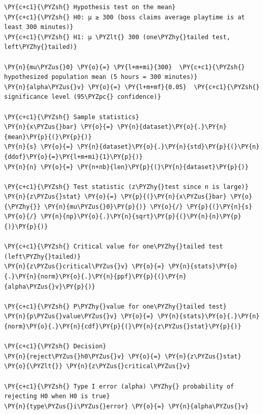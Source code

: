     \begin{tcolorbox}[breakable, size=fbox, boxrule=1pt, pad at break*=1mm,colback=cellbackground, colframe=cellborder]
\begin{Verbatim}[commandchars=\\\{\}]
\PY{c+c1}{\PYZsh{} Hypothesis test on the mean}
\PY{c+c1}{\PYZsh{} H0: μ ≥ 300 (boss claims average playtime is at least 300 minutes)}
\PY{c+c1}{\PYZsh{} H1: μ \PYZlt{} 300 (one\PYZhy{}tailed test, left\PYZhy{}tailed)}

\PY{n}{mu\PYZus{}0} \PY{o}{=} \PY{l+m+mi}{300}  \PY{c+c1}{\PYZsh{} hypothesized population mean (5 hours = 300 minutes)}
\PY{n}{alpha\PYZus{}v} \PY{o}{=} \PY{l+m+mf}{0.05}  \PY{c+c1}{\PYZsh{} significance level (95\PYZpc{} confidence)}

\PY{c+c1}{\PYZsh{} Sample statistics}
\PY{n}{x\PYZus{}bar} \PY{o}{=} \PY{n}{dataset}\PY{o}{.}\PY{n}{mean}\PY{p}{(}\PY{p}{)}
\PY{n}{s} \PY{o}{=} \PY{n}{dataset}\PY{o}{.}\PY{n}{std}\PY{p}{(}\PY{n}{ddof}\PY{o}{=}\PY{l+m+mi}{1}\PY{p}{)}
\PY{n}{n} \PY{o}{=} \PY{n+nb}{len}\PY{p}{(}\PY{n}{dataset}\PY{p}{)}

\PY{c+c1}{\PYZsh{} Test statistic (z\PYZhy{}test since n is large)}
\PY{n}{z\PYZus{}stat} \PY{o}{=} \PY{p}{(}\PY{n}{x\PYZus{}bar} \PY{o}{\PYZhy{}} \PY{n}{mu\PYZus{}0}\PY{p}{)} \PY{o}{/} \PY{p}{(}\PY{n}{s} \PY{o}{/} \PY{n}{np}\PY{o}{.}\PY{n}{sqrt}\PY{p}{(}\PY{n}{n}\PY{p}{)}\PY{p}{)}

\PY{c+c1}{\PYZsh{} Critical value for one\PYZhy{}tailed test (left\PYZhy{}tailed)}
\PY{n}{z\PYZus{}critical\PYZus{}v} \PY{o}{=} \PY{n}{stats}\PY{o}{.}\PY{n}{norm}\PY{o}{.}\PY{n}{ppf}\PY{p}{(}\PY{n}{alpha\PYZus{}v}\PY{p}{)}

\PY{c+c1}{\PYZsh{} P\PYZhy{}value for one\PYZhy{}tailed test}
\PY{n}{p\PYZus{}value\PYZus{}v} \PY{o}{=} \PY{n}{stats}\PY{o}{.}\PY{n}{norm}\PY{o}{.}\PY{n}{cdf}\PY{p}{(}\PY{n}{z\PYZus{}stat}\PY{p}{)}

\PY{c+c1}{\PYZsh{} Decision}
\PY{n}{reject\PYZus{}h0\PYZus{}v} \PY{o}{=} \PY{n}{z\PYZus{}stat} \PY{o}{\PYZlt{}} \PY{n}{z\PYZus{}critical\PYZus{}v}

\PY{c+c1}{\PYZsh{} Type I error (alpha) \PYZhy{} probability of rejecting H0 when H0 is true}
\PY{n}{type\PYZus{}i\PYZus{}error} \PY{o}{=} \PY{n}{alpha\PYZus{}v}


\end{Verbatim}
\end{tcolorbox}

